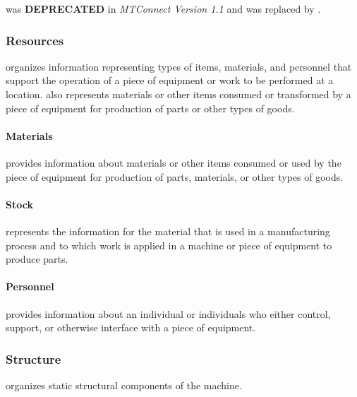  was \textbf{DEPRECATED} in \textit{MTConnect Version 1.1} and was replaced by .


\subsubsection{Resources}
\label{sec:Resources}



 organizes information representing types of items, materials, and personnel that support the operation of a piece of equipment or work to be performed at a location.  also represents materials or other items consumed or transformed by a piece of equipment for production of parts or other types of goods.


\paragraph{Materials}\mbox{}
\label{sec:Materials}


 provides information about materials or other items consumed or used by the piece of equipment for production of parts, materials, or other types of goods.


\paragraph{Stock}\mbox{}
\label{sec:Stock}


 represents the information for the material that is used in a manufacturing process and to which work is applied in a machine or piece of equipment to produce parts.


\paragraph{Personnel}\mbox{}
\label{sec:Personnel}


 provides information about an individual or individuals who either control, support, or otherwise interface with a piece of equipment.



\subsubsection{Structure}
\label{sec:Structure}



 organizes static structural components of the machine.


